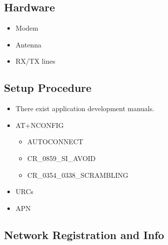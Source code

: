 \documentclass[]{article}
\providecommand{\tightlist}{%
  \setlength{\itemsep}{0pt}\setlength{\parskip}{0pt}}
\begin{document}
\hypertarget{lit_hardware}{%
\subsection{Hardware}\label{lit_hardware}}

\begin{itemize}
\tightlist
\item
  Modem
\item
  Antenna
\item
  RX/TX lines
\end{itemize}

\hypertarget{lit_setup}{%
\subsection{Setup Procedure}\label{lit_setup}}

\begin{itemize}
\tightlist
\item
  There exist application development manuals.
\item
  AT+NCONFIG

  \begin{itemize}
  \tightlist
  \item
    AUTOCONNECT
  \item
    CR\_0859\_SI\_AVOID
  \item
    CR\_0354\_0338\_SCRAMBLING
  \end{itemize}
\item
  URCs
\item
  APN
\end{itemize}

\hypertarget{nw_reg_info}{%
\subsection{Network Registration and Info}\label{nw_reg_info}}
\end{document}
